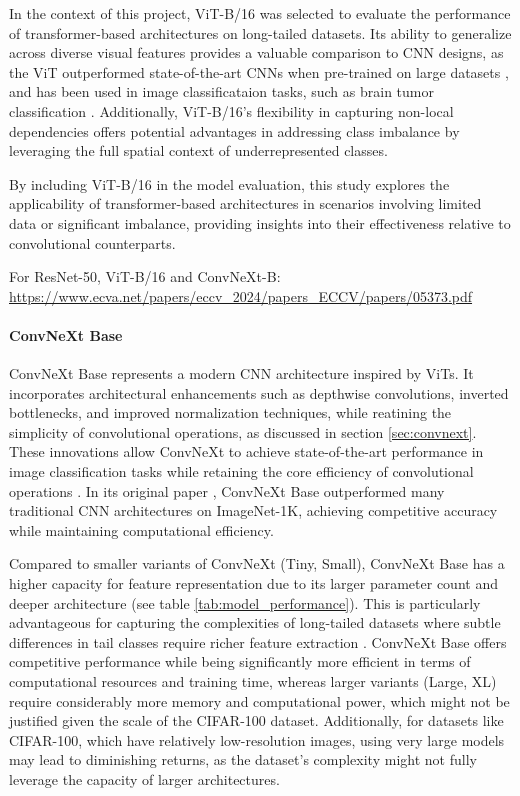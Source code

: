 In the context of this project, ViT-B/16 was selected to evaluate the performance of transformer-based architectures on long-tailed datasets. Its ability to generalize across diverse visual features provides a valuable comparison to CNN designs, as the ViT outperformed state-of-the-art CNNs when pre-trained on large datasets \cite{dosovitskiy2021imageworth16x16words}, and has been used in image classificataion tasks, such as brain tumor classification \cite{asiri2023advancing}. Additionally, ViT-B/16’s flexibility in capturing non-local dependencies offers potential advantages in addressing class imbalance by leveraging the full spatial context of underrepresented classes.

By including ViT-B/16 in the model evaluation, this study explores the applicability of transformer-based architectures in scenarios involving limited data or significant imbalance, providing insights into their effectiveness relative to convolutional counterparts.

For ResNet-50, ViT-B/16 and ConvNeXt-B:
\url{https://www.ecva.net/papers/eccv_2024/papers_ECCV/papers/05373.pdf}


\paragraph{ConvNeXt Base}
ConvNeXt Base \cite{liu2022convnet2020s} represents a modern CNN architecture inspired by ViTs. It incorporates architectural enhancements such as depthwise convolutions, inverted bottlenecks, and improved normalization techniques, while reatining the simplicity of convolutional operations, as discussed in section \ref{sec:convnext}. These innovations allow ConvNeXt to achieve state-of-the-art performance in image classification tasks while retaining the core efficiency of convolutional operations \cite{liu2022convnet2020s}. In its original paper \cite{liu2022convnet2020s}, ConvNeXt Base outperformed many traditional CNN architectures on ImageNet-1K, achieving competitive accuracy while maintaining computational efficiency. 

Compared to smaller variants of ConvNeXt (Tiny, Small), ConvNeXt Base has a higher capacity for feature representation due to its larger parameter count and deeper architecture (see table \ref{tab:model_performance}). This is particularly advantageous for capturing the complexities of long-tailed datasets where subtle differences in tail classes require richer feature extraction \cite{liu2022convnet2020s}. ConvNeXt Base offers competitive performance while being significantly more efficient in terms of computational resources and training time, whereas larger variants (Large, XL) require considerably more memory and computational power, which might not be justified given the scale of the CIFAR-100 dataset. Additionally, for datasets like CIFAR-100, which have relatively low-resolution images, using very large models may lead to diminishing returns, as the dataset's complexity might not fully leverage the capacity of larger architectures.



